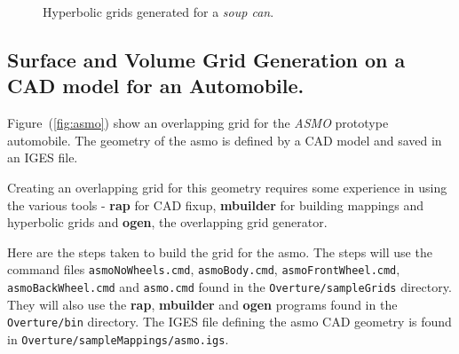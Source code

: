 {
\newcommand{\figWidthd}{7.5cm}
\newcommand{\trimfig}[2]{\trimPlot{#1}{#2}{.0}{.0}{.0}{.025}}
\begin{figure}[hbt]
\begin{center}
\end{center}
\caption{Hyperbolic grids generated for a {\em soup can}.}
\end{figure}
}



\clearpage
\subsection{Surface and Volume Grid Generation on a CAD model for an Automobile.}

Figure~(\ref{fig:asmo}) show an overlapping grid for the {\it ASMO} prototype
automobile. The geometry of the asmo is defined by a CAD model and saved
in an IGES file. 

Creating an overlapping grid for this geometry requires some experience in using the
various tools - {\bf rap} for CAD fixup, {\bf mbuilder} for building mappings and hyperbolic grids
and {\bf ogen}, the overlapping grid generator.

Here are the steps taken to build the grid for the asmo. The steps will use the
command files {\tt asmoNoWheels.cmd}, {\tt asmoBody.cmd}, {\tt asmoFrontWheel.cmd},
{\tt asmoBackWheel.cmd} and {\tt asmo.cmd} found in the {\tt Overture/sampleGrids}
directory. They will also use the {\bf rap}, {\bf mbuilder} and {\bf ogen} programs found
in the {\tt Overture/bin} directory. The IGES file defining the asmo CAD geometry is found in 
{\tt Overture/\-sample\-Mappings/\-asmo.igs}.

